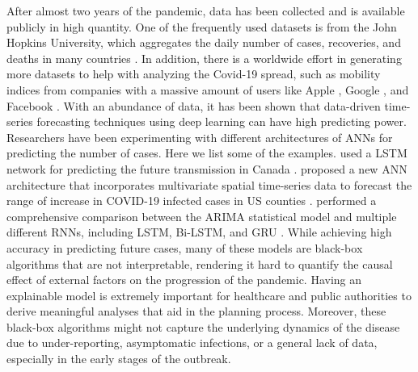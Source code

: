 After almost two years of the pandemic, data has been collected and is available publicly in high quantity.
One of the frequently used datasets is from the John Hopkins University, which aggregates the daily number of cases, recoveries, and deaths in many countries \cite{dongInteractiveWebbasedDashboard2020}.
In addition, there is a worldwide effort in generating more datasets to help with analyzing the Covid-19 spread, such as mobility indices from companies with a massive amount of users like Apple \cite{COVID19Mobility}, Google \cite{COVID19Mobility}, and Facebook \cite{DataGoodTools}.
With an abundance of data, it has been shown that data-driven time-series forecasting techniques using deep learning can have high predicting power.
Researchers have been experimenting with different architectures of \glspl{ANN} for predicting the number of cases.
Here we list some of the examples.
\citeauthor{chimmulaTimeSeriesForecasting2020} used a \gls{LSTM} network for predicting the future transmission in Canada \cite{chimmulaTimeSeriesForecasting2020}.
\citeauthor{ramchandaniDeepCOVIDNetInterpretableDeep2020} proposed a new \gls{ANN} architecture that incorporates multivariate spatial time-series data to forecast the range of increase in COVID-19 infected cases in \gls{US} counties \cite{ramchandaniDeepCOVIDNetInterpretableDeep2020}.
\citeauthor{shahidPredictionsCOVID19Deep2020} performed a comprehensive comparison between the \gls{ARIMA} statistical model and multiple different \glspl{RNN}, including \gls{LSTM}, \gls{Bi-LSTM}, and \gls{GRU} \cite{shahidPredictionsCOVID19Deep2020}.
While achieving high accuracy in predicting future cases, many of these models are black-box algorithms that are not interpretable, rendering it hard to quantify the causal effect of external factors on the progression of the pandemic.
Having an explainable model is extremely important for healthcare and public authorities to derive meaningful analyses that aid in the planning process.
Moreover, these black-box algorithms might not capture the underlying dynamics of the disease due to under-reporting, asymptomatic infections, or a general lack of data, especially in the early stages of the outbreak.


